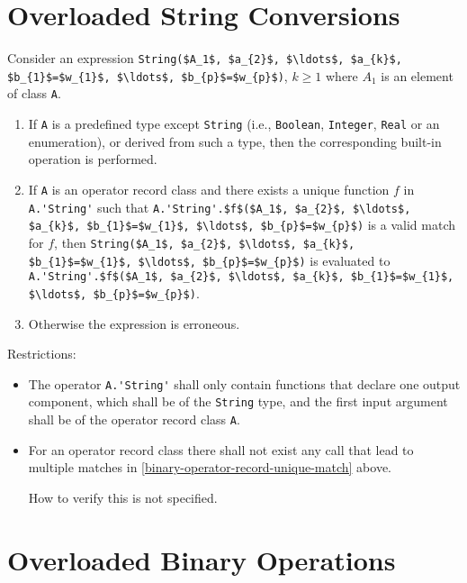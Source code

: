 \section{Overloaded String Conversions}\label{overloaded-string-conversions}

Consider an expression \lstinline!String($A_1$, $a_{2}$, $\ldots$, $a_{k}$, $b_{1}$=$w_{1}$, $\ldots$, $b_{p}$=$w_{p}$)!, $k \geq 1$ where $A_1$ is an element of class \lstinline!A!.

\begin{enumerate}
\item
  If \lstinline!A! is a predefined type except \lstinline!String! (i.e., \lstinline!Boolean!, \lstinline!Integer!, \lstinline!Real! or an enumeration), or derived from such a type, then the corresponding built-in operation is performed.
\item\label{binary-operator-record-unique-match}
  If \lstinline!A! is an operator record class and there exists a unique function $f$ in \lstinline!A.'String'! such that
  \lstinline!A.'String'.$f$($A_1$, $a_{2}$, $\ldots$, $a_{k}$, $b_{1}$=$w_{1}$, $\ldots$, $b_{p}$=$w_{p}$)!
  is a valid match for $f$, then
  \lstinline!String($A_1$, $a_{2}$, $\ldots$, $a_{k}$, $b_{1}$=$w_{1}$, $\ldots$, $b_{p}$=$w_{p}$)!
  is evaluated to\\
  \lstinline!A.'String'.$f$($A_1$, $a_{2}$, $\ldots$, $a_{k}$, $b_{1}$=$w_{1}$, $\ldots$, $b_{p}$=$w_{p}$)!.
\item
  Otherwise the expression is erroneous.
\end{enumerate}

Restrictions:
\begin{itemize}
\item
  The operator \lstinline!A.'String'! shall only contain functions that declare one output component, which shall be of the \lstinline!String! type, and the first input argument shall be of the operator record class \lstinline!A!.
\item
  For an operator record class there shall not exist any call that lead to multiple matches in \cref{binary-operator-record-unique-match} above.
  \begin{nonnormative}
  How to verify this is not specified.
  \end{nonnormative}
\end{itemize}

\section{Overloaded Binary Operations}\label{overloaded-binary-operations}

